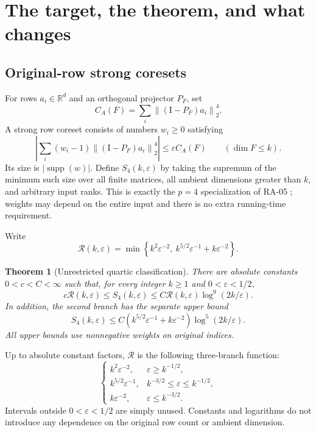 \documentclass[11pt]{article}
\newtheorem{theorem}{Theorem}[section]
\theoremstyle{remark}\newtheorem{remark}[theorem]{Remark}
\newcommand{\R}{\mathbb R}\newcommand{\E}{\mathbb E}\newcommand{\Prob}{\mathbb P}
\newcommand{\supp}{\operatorname{supp}}\newcommand{\Sym}{\operatorname{Sym}}
\newcommand{\norm}[1]{\left\lVert#1\right\rVert}\newcommand{\abs}[1]{\left|#1\right|}
\newcommand{\Id}{\mathrm I}\newcommand{\dbar}{\bar d}
\numberwithin{equation}{section}
\begin{document}
\section{The target, the theorem, and what changes}
\subsection{Original-row strong coresets}
For rows $a_i\in\R^d$ and an orthogonal projector $P_F$, set
\[
 C_A(F)=\sum_i\norm{(\Id-P_F)a_i}_2^4.
\]
A strong row coreset consists of numbers $w_i\ge0$ satisfying
\begin{equation}\label{eq:strong}
 \abs{\sum_i(w_i-1)\norm{(\Id-P_F)a_i}_2^4}
 \le\varepsilon C_A(F)\qquad(\dim F\le k).
\end{equation}
Its size is $|\supp(w)|$. Define $S_4(k,\varepsilon)$ by taking the supremum of the minimum such size over all finite matrices, all ambient dimensions greater than $k$, and arbitrary input ranks. This is exactly the $p=4$ specialization of RA-05 \cite{repo}; weights may depend on the entire input and there is no extra running-time requirement.

Write
\begin{equation}\label{eq:R}
 \mathcal R(k,\varepsilon)=
 \min\left\{k^2\varepsilon^{-2},\ k^{5/2}\varepsilon^{-1}+k\varepsilon^{-2}\right\}.
\end{equation}
\begin{theorem}[Unrestricted quartic classification]\label{thm:main}
There are absolute constants $0<c<C<\infty$ such that, for every integer $k\ge1$ and $0<\varepsilon<1/2$,
\begin{equation}\label{eq:main}
 c\mathcal R(k,\varepsilon)\le S_4(k,\varepsilon)
 \le C\mathcal R(k,\varepsilon)\log^9(2k/\varepsilon).
\end{equation}
In addition, the second branch has the separate upper bound
\begin{equation}\label{eq:newupper}
 S_4(k,\varepsilon)\le
 C\left(k^{5/2}\varepsilon^{-1}+k\varepsilon^{-2}\right)\log^5(2k/\varepsilon).
\end{equation}
All upper bounds use nonnegative weights on original indices.
\end{theorem}
Up to absolute constant factors, $\mathcal R$ is the following three-branch function:
\begin{equation}\label{eq:regimes}
 \begin{cases}
 k^2\varepsilon^{-2},&\varepsilon\ge k^{-1/2},\\
 k^{5/2}\varepsilon^{-1},&k^{-3/2}\le\varepsilon\le k^{-1/2},\\
 k\varepsilon^{-2},&\varepsilon\le k^{-3/2}.
 \end{cases}
\end{equation}
Intervals outside $0<\varepsilon<1/2$ are simply unused. Constants and logarithms do not introduce any dependence on the original row count or ambient dimension.
\end{document}
